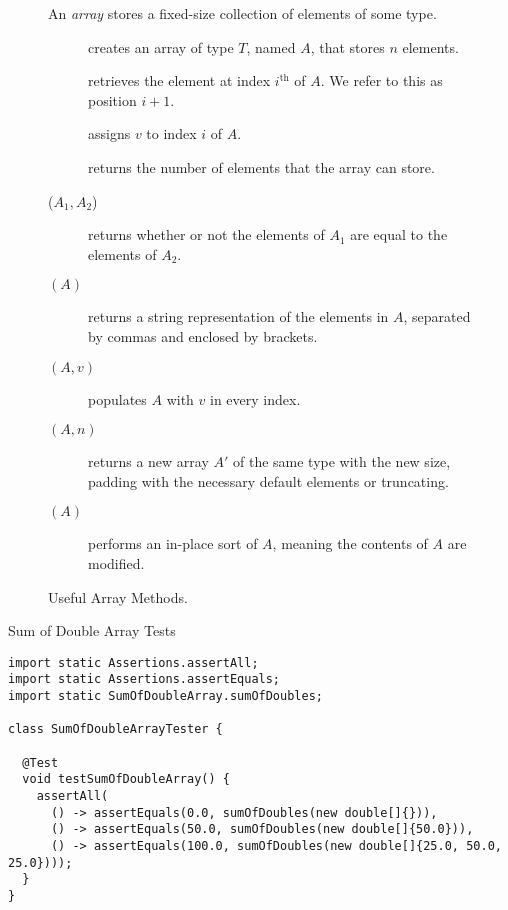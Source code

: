 \begin{figure}[tp]
  \small
  \begin{tcolorbox}[title=Java Arrays]
    An \emph{array} stores a fixed-size collection of elements of some type.
    \vspace{2ex}
  \begin{description}
    \item [] creates an array of type $T$, named $A$, that stores $n$ elements.
    \item [] retrieves the element at index $i^{\text{th}}$ of $A$. We refer to this as position $i + 1$.
    \item [] assigns $v$ to index $i$ of $A$.
    \item [] returns the number of elements that the array can store.
    \item [($A_1, A_2$)] returns whether or not the elements of $A_1$ are equal to the elements of $A_2$.
    \item [$(A)$] returns a string representation of the elements in $A$, separated by commas and enclosed by brackets.
    \item [$(A, v)$] populates $A$ with $v$ in every index.
    \item [$(A, n)$] returns a new array $A'$ of the same type with the new size, padding with the necessary default elements or truncating.
    \item [$(A)$] performs an in-place sort of $A$, meaning the contents of $A$ are modified.
  \end{description}
\end{tcolorbox}
  \caption{Useful Array Methods.}
  \label{fig:arrays}
\end{figure}


\begin{cl}[]{Sum of Double Array Tests}
\begin{lstlisting}[language=MyJava]
import static Assertions.assertAll;
import static Assertions.assertEquals;
import static SumOfDoubleArray.sumOfDoubles;

class SumOfDoubleArrayTester {

  @Test
  void testSumOfDoubleArray() {
    assertAll(
      () -> assertEquals(0.0, sumOfDoubles(new double[]{})),
      () -> assertEquals(50.0, sumOfDoubles(new double[]{50.0})),
      () -> assertEquals(100.0, sumOfDoubles(new double[]{25.0, 50.0, 25.0})));
  }
}
\end{lstlisting}
\end{cl}


